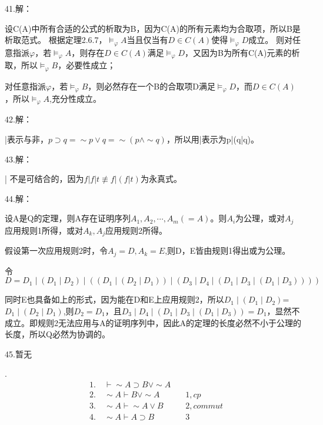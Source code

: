 \documentclass[a4paper]{ctexart}
\begin{document}
\noindent 41.解：

设C(A)中所有合适的公式的析取为B，因为C(A)的所有元素均为合取项，所以B是析取范式。
根据定理2.6.7，$\models_{\varphi}A$当且仅当有$D\in C(A)$使得$\models_\varphi D$成立。
则对任意指派$\varphi$，若$\models_{\varphi}A$，则存在$D\in C(A)$满足$\models_\varphi D$，又因为B为所有C(A)元素的析取，所以$\models_\varphi B$，必要性成立；

对任意指派$\varphi$，若$\models_{\varphi}B$，则必然存在一个B的合取项D满足$\models_\varphi D$，而$D\in C(A)$，所以$\models_{\varphi}A$,充分性成立。\newline

\noindent 42.解：

|表示与非，$p\supset q=\sim p\vee q=\sim(p\wedge\sim q)$，所以用|表示为p|(q|q)。\newline

\noindent 43.解：

| 不是可结合的，因为$f|f|t\not\equiv f|(f|t)$为永真式。\newline

\noindent 44.解：

设A是Q的定理，则A存在证明序列$A_1,A_2,\cdots,A_m(=A)$。则$A_i$为公理，或对$A_j$应用规则1所得，或对$A_k,A_j$应用规则2所得。

假设第一次应用规则2时，令$A_j=D,A_k=E$,则D，E皆由规则1得出或为公理。

令$D=D_1\mid\left( D_1\mid D_2\right) \mid \left( \left( D_1\mid\left( D_2\mid D_1\right) \right) \mid\left( D_3\mid D_4\mid\left( D_1\mid D_3\mid\left( D_1\mid D_3\right) \right) \right) \right)$

同时E也具备如上的形式，因为能在D和E上应用规则2，所以$D_1\mid(D_1\mid D_2)$=$D_1\mid(D_2\mid D_1)$,则$D_2=D_1$，且$D_3\mid D_4\mid\left( D_1\mid D_3\mid\left( D_1\mid D_3\right) \right) =D_1$，显然不成立。即规则2无法应用与A的证明序列中，因此A的定理的长度必然不小于公理的长度，所以Q必然为协调的。\newline

\noindent 45.暂无

.
\begin{align*}
  &1.\quad \vdash \sim A\supset B\vee \sim A \quad &\\
  &2.\quad \sim A \vdash B\vee \sim A \quad& 1,cp \\ 
  &3.\quad \sim A \vdash \sim A \vee B \quad & 2,commut\\ 
  &4.\quad \sim A \vdash A\supset B\quad & 3 \\ 
\end{align*}
\end{document}
